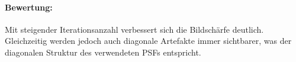 \paragraph{Bewertung:}
Mit steigender Iterationsanzahl verbessert sich die Bildschärfe deutlich. Gleichzeitig werden jedoch auch diagonale Artefakte immer sichtbarer, was der diagonalen Struktur des verwendeten PSFs entspricht.

\noindent
\begin{minipage}[t]{0.33\textwidth}
\end{minipage}
%
\begin{minipage}[t]{0.33\textwidth}
\end{minipage}
%
\begin{minipage}[t]{0.33\textwidth}
\end{minipage}